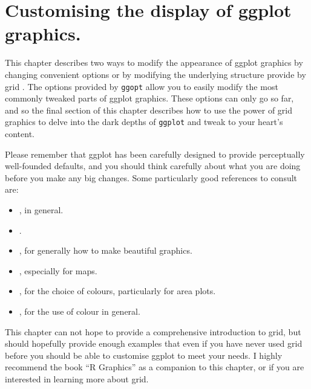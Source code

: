 


\newpage
\chapter{Customising the display of ggplot graphics.}

This chapter describes two ways to modify the appearance of ggplot graphics by changing convenient options or by modifying the underlying structure provide by grid \citep{grid}.  The options provided by {\tt ggopt} allow you to easily modify the most commonly tweaked parts of ggplot graphics.  These options can only go so far, and so the final section of this chapter describes how to use the power of grid graphics to delve into the dark depths of {\tt ggplot} and tweak to your heart's content.  

Please remember that ggplot has been carefully designed to provide perceptually well-founded defaults, and you should think carefully about what you are doing before you make any big changes.  Some particularly good references to consult are:

\begin{itemize}
	\item \citet{wilkinson:2006}, in general.
	\item \citet{cleveland:1993,cleveland:1987,cleveland:1994}.
	\item \citet{tufte:2006,tufte:1990,tufte:1997,tufte:2001}, for generally how to make beautiful graphics.
	\item \citet{bertin:1983,bertin:1967}, especially for maps.
	\item \citet{brewer:1994,brewer:1994a}, for the choice of colours, particularly for area plots.
	\item \citet{carr:1999,carr:1994,carr:2002}, for the use of colour in general.
\end{itemize}

This chapter can not hope to provide a comprehensive introduction to grid, but should hopefully provide enough examples that even if you have never used grid before you should be able to customise ggplot to meet your needs.  I highly recommend the book ``R Graphics'' \citep{murrell:2005} as a companion to this chapter, or if you are interested in learning more about grid.   

